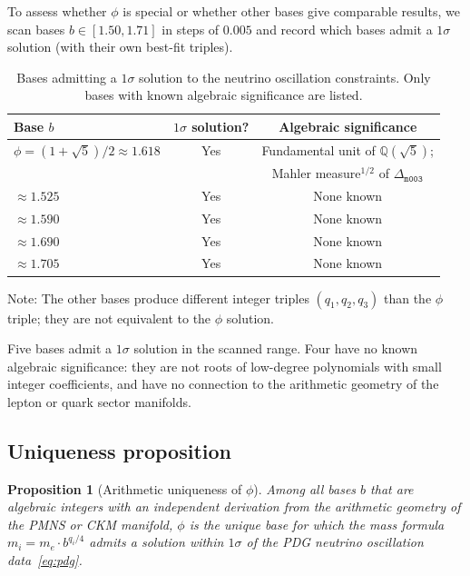 \documentclass[12pt]{article}
\newtheorem{proposition}[theorem]{Proposition}
\theoremstyle{definition}
\begin{document}
To assess whether $\phi$ is special or whether other bases give
comparable results, we scan bases $b \in [1.50, 1.71]$ in steps
of $0.005$ and record which bases admit a $1\sigma$ solution
(with their own best-fit triples).

\begin{table}[htbp]
\centering
\caption{Bases admitting a $1\sigma$ solution to the neutrino
oscillation constraints. Only bases with known algebraic
significance are listed.}
\label{tab:bases}
\begin{tabular}{lcc}
\toprule
Base $b$ & $1\sigma$ solution? & Algebraic significance \\
\midrule
$\phi = (1+\sqrt{5})/2 \approx 1.618$ & Yes & Fundamental unit of
  $\mathbb{Q}(\sqrt{5})$; \\
  & & Mahler measure$^{1/2}$ of $\Delta_{\texttt{m003}}$ \\
$\approx 1.525$ & Yes & None known \\
$\approx 1.590$ & Yes & None known \\
$\approx 1.690$ & Yes & None known \\
$\approx 1.705$ & Yes & None known \\
\bottomrule
\end{tabular}
\smallskip
{\small Note: The other bases produce different integer triples
$(q_1,q_2,q_3)$ than the $\phi$ triple; they are not equivalent
to the $\phi$ solution.}
\end{table}

Five bases admit a $1\sigma$ solution in the scanned range. Four
have no known algebraic significance: they are not roots of
low-degree polynomials with small integer coefficients, and have
no connection to the arithmetic geometry of the lepton or quark
sector manifolds.

\subsection{Uniqueness proposition}

\begin{proposition}[Arithmetic uniqueness of $\phi$]
\label{prop:unique}
Among all bases $b$ that are algebraic integers with an independent
derivation from the arithmetic geometry of the PMNS or CKM manifold,
$\phi$ is the unique base for which the mass formula
$m_i = m_e \cdot b^{q_i/4}$ admits a solution within $1\sigma$ of
the PDG neutrino oscillation data~\eqref{eq:pdg}.
\end{proposition}
\end{document}
